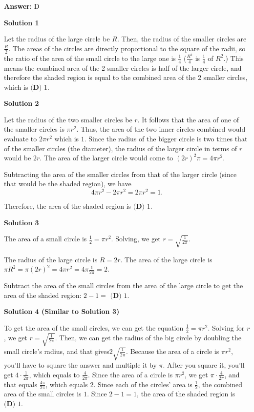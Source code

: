 \begin{enumerate}
 \textbf{Answer: }D



\textbf{Solution 1}

Let the radius of the large circle be $R$. Then, the radius of the smaller circles are $\frac R2$. The areas of the circles are directly proportional to the square of the radii, so the ratio of the area of the small circle to the large one is $\frac 14$ ($\frac {R^2}{4}$ is $\frac 14$ of $R^2$.) This means the combined area of the 2 smaller circles is half of the larger circle, and therefore the shaded region is equal to the combined area of the 2 smaller circles, which is $\boxed{\textbf{(D) } 1}$.

 



\textbf{Solution 2}

Let the radius of the two smaller circles be $r$. It follows that the area of one of the smaller circles is ${\pi}r^2$. Thus, the area of the two inner circles combined would evaluate to $2{\pi}r^2$ which is $1$. Since the radius of the bigger circle is two times that of the smaller circles (the diameter), the radius of the larger circle in terms of $r$ would be $2r$. The area of the larger circle would come to $(2r)^2{\pi} = 4{\pi}r^2$. 

 Subtracting the area of the smaller circles from that of the larger circle (since that would be the shaded region), we have 
 \[4{\pi}r^2 - 2{\pi}r^2 = 2{\pi}r^2 = 1.\]

 Therefore, the area of the shaded region is $\boxed{\textbf{(D) } 1}$.

 



\textbf{Solution 3}

The area of a small circle is $\frac{1}{2}= \pi r^2$. Solving, we get $r = \sqrt{\frac{1}{2\pi}}$.

 The radius of the large circle is $R=2r$.  The area of the large circle is ${\pi}R^2={\pi}(2r)^2=4{\pi}r^2=4{\pi}\frac{1}{2\pi}=2$.

 Subtract the area of the small circles from the area of the large circle to get the area of the shaded region: $2-1=$ $\boxed{\textbf{(D) } 1}$.

 



\textbf{Solution 4 (Similar to Solution 3)}

To get the area of the small circles, we can get the equation $\frac{1}{2}= \pi r^2$. Solving for $r$, we get $r = \sqrt{\frac{1}{2\pi}}$. Then, we can get the radius of the big circle by doubling the small circle's radius, and that gives$2\sqrt{\frac{1}{2\pi}}$. Because the area of a circle is $\pi r^2$, you'll have to square the answer and multiple it by $\pi$. After you square it, you'll get $4 \cdot \frac{1}{2\pi}$, which equals to $\frac{4}{2\pi}$. Since the area of a circle is $\pi r^2$, we get $\pi \cdot \frac{4}{2\pi}$, and that equals $\frac{4\pi}{2\pi}$, which equals 2. Since each of the circles' area is $\frac{1}{2}$, the combined area of the small circles is $1$. Since $2-1=1$, the area of the shaded region is $\boxed{\textbf{(D) } 1}$.


\end{enumerate}
